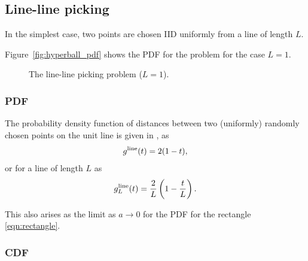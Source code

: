 \subsection{Line-line picking}
\label{sec:line_line}

In the simplest case, two points are chosen IID uniformly from a line
of length $L$. 

Figure~\ref{fig:hyperball_pdf} shows the PDF for the problem for the
case $L=1$.

\begin{figure}[tbp]
  \begin{center}
    \caption{The line-line picking problem ($L=1$).}
  \end{center} 
\vspace{-4mm}
\end{figure}

\subsubsection{PDF}

The probability density function of distances between two (uniformly)
randomly chosen points on the unit line is given in
\cite{weisstein:_line_line_picking,b.ghosh51:_random_rect}, as
\begin{equation}
  \label{eq:line_line}
  g^{\rm line}(t) = 2(1-t),
\end{equation}
or for a line of length $L$ as
\begin{equation}
  \label{eq:line_lineL}
  g^{\rm line}_L(t) = \frac{2}{L} \left( 1-\frac{t}{L} \right).
\end{equation}

This also arises as the limit as $a \rightarrow 0$ for the PDF for the
rectangle \eqref{eqn:rectangle}.

\subsubsection{CDF}

